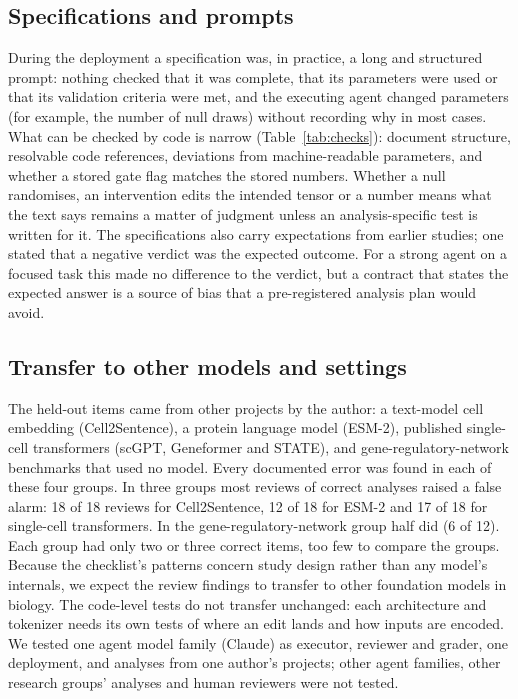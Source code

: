 \subsection*{Specifications and prompts}
During the deployment a specification was, in practice, a long and
structured prompt: nothing checked that it was complete, that its
parameters were used or that its validation criteria were met, and the
executing agent changed parameters (for example, the number of null
draws) without recording why in most cases. What can be checked by code
is narrow (Table~\ref{tab:checks}): document structure, resolvable code
references, deviations from machine-readable parameters, and whether a
stored gate flag matches the stored numbers. Whether a null randomises,
an intervention edits the intended tensor or a number means what the text
says remains a matter of judgment unless an analysis-specific test is
written for it. The specifications also carry expectations from earlier
studies; one stated that a negative verdict was the expected outcome. For
a strong agent on a focused task this made no difference to the verdict,
but a contract that states the expected answer is a source of bias that a
pre-registered analysis plan would avoid.

\subsection*{Transfer to other models and settings}
The held-out items came from other projects by the author: a text-model
cell embedding (Cell2Sentence), a protein language model (ESM-2), published
single-cell transformers (scGPT, Geneformer and STATE), and
gene-regulatory-network benchmarks that used no model. Every documented
error was found in each of these four groups. In three groups most
reviews of correct analyses raised a false alarm: 18 of 18 reviews for
Cell2Sentence, 12 of 18 for ESM-2 and 17 of 18 for single-cell
transformers. In the gene-regulatory-network group half did (6 of 12).
Each group had only two or three correct items, too few to compare the
groups. Because the checklist's patterns concern study
design rather than any model's internals, we expect the review findings
to transfer to other foundation models in biology. The code-level tests do not transfer
unchanged: each architecture and tokenizer needs its own tests of where an
edit lands and how inputs are encoded. We tested one agent model family
(Claude) as executor, reviewer and grader, one deployment, and analyses
from one author's projects; other agent families, other research groups'
analyses and human reviewers were not tested.

